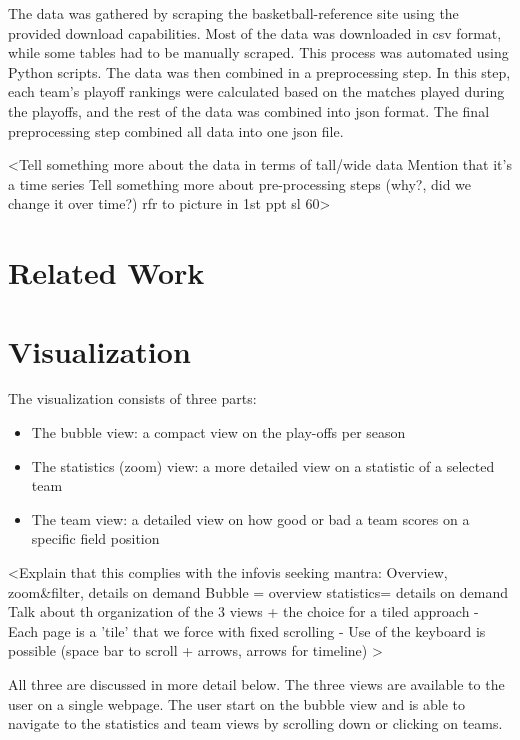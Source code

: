 \documentclass{sigchi}
\begin{document}
The data was gathered by scraping the basketball-reference site using the
provided download capabilities. Most of the data was downloaded in csv format,
while some tables had to be manually scraped. This process was automated using
Python scripts. The data was then combined in a preprocessing step. In this
step, each team's playoff rankings were calculated based on the matches played
during the playoffs, and the rest of the data was combined into json format. The
final preprocessing step combined all data into one json file.

<Tell something more about the data in terms of tall/wide data
Mention that it's a time series
Tell something more about pre-processing steps (why?, did we change it over time?)
rfr to picture in 1st ppt sl 60>
\section{Related Work}\label{sec:literature}


\section{Visualization}\label{sec:visualization}
The visualization consists of three parts:
\begin{itemize}
    \item The bubble view: a compact view on the play-offs per season
    \item The statistics (zoom) view: a more detailed view on a statistic of a selected team
    \item The team view: a detailed view on how good or bad a team scores on a specific field position
\end{itemize}

<Explain that this complies with the infovis seeking mantra: Overview, zoom&filter, details on demand
Bubble = overview
statistics= details on demand
Talk about th organization of the 3 views + the choice for a tiled approach
- Each page is a 'tile' that we force with fixed scrolling
- Use of the keyboard is possible (space bar to scroll + arrows, arrows for timeline)
>

All three are discussed in more detail below. The three views are available to
the user on a single webpage. The user start on the bubble view and is able to
navigate to the statistics and team views by scrolling down or clicking on
teams.
\end{document}

